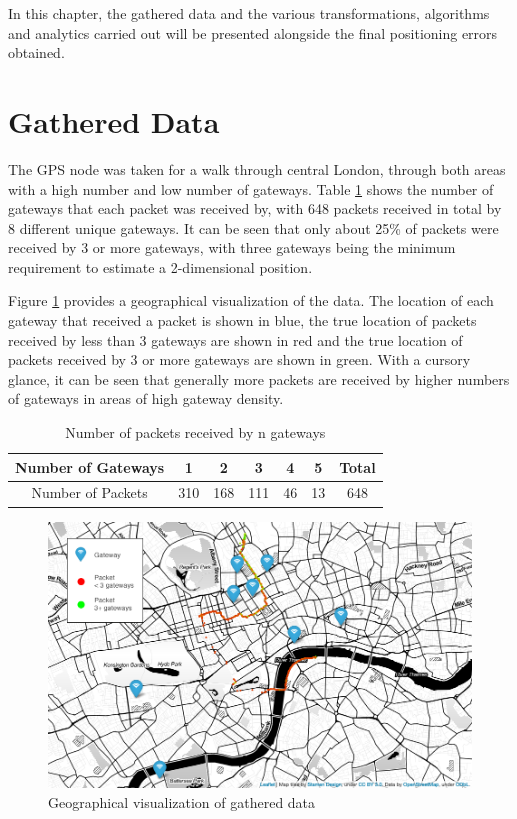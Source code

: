 \documentclass[a4paper]{report}
\begin{document}
  In this chapter, the gathered data and the various transformations, algorithms and analytics carried out will be presented alongside the final positioning errors obtained.

  \section{Gathered Data}

    The GPS node was taken for a walk through central London, through both areas with a high number and low number of gateways. Table \ref{tab:gatewaynums} shows the number of gateways that each packet was received by, with 648 packets received in total by 8 different unique gateways. It can be seen that only about 25\% of packets were received by 3 or more gateways, with three gateways being the minimum requirement to estimate a 2-dimensional position.

    Figure \ref{fig:datamap} provides a geographical visualization of the data. The location of each gateway that received a packet is shown in blue, the true location of packets received by less than 3 gateways are shown in red and the true location of packets received by 3 or more gateways are shown in green. With a cursory glance, it can be seen that generally more packets are received by higher numbers of gateways in areas of high gateway density.

    \begin{table}[h]
      \begin{center}
        \caption{Number of packets received by n gateways}
        \begin{tabular}{|c|c|c|c|c|c|c|}
          \hline
          Number of Gateways & 1 & 2 & 3 & 4 & 5 & Total \\
          \hline
          Number of Packets & 310 & 168 & 111 & 46 & 13 & 648 \\
          \hline
        \end{tabular}
      \end{center}
      \label{tab:gatewaynums}
    \end{table}

    \begin{figure}[h]
    \centering
    \includegraphics[width=12cm]{figures/map_data.png}
    \caption{Geographical visualization of gathered data}
    \label{fig:datamap}
    \end{figure}
\end{document}
